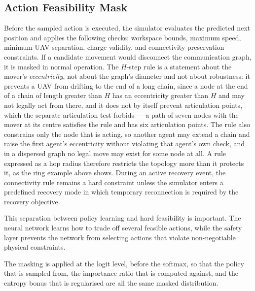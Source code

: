 \documentclass[conference]{IEEEtran}
\begin{document}
\subsection{Action Feasibility Mask}
Before the sampled action is executed, the simulator evaluates the predicted next position and applies the following checks: workspace bounds, maximum speed, minimum UAV separation, charge validity, and connectivity-preservation constraints. If a candidate movement would disconnect the communication graph, it is masked in normal operation.  The $H$-step rule is a statement about the mover's \emph{eccentricity}, not about the graph's diameter and not about robustness: it prevents a UAV from drifting to the end of a long chain, since a node at the end of a chain of length greater than $H$ has an eccentricity greater than $H$ and may not legally act from there, and it does not by itself prevent articulation points, which the separate articulation test forbids --- a path of seven nodes with the mover at its centre satisfies the rule and has six articulation points. The rule also constrains only the node that is acting, so another agent may extend a chain and raise the first agent's eccentricity without violating that agent's own check, and in a dispersed graph no legal move may exist for some node at all.  A rule expressed as a hop radius therefore restricts the topology more than it protects it, as the ring example above shows. During an active recovery event, the connectivity rule remains a hard constraint unless the simulator enters a predefined recovery mode in which temporary reconnection is required by the recovery objective.

This separation between policy learning and hard feasibility is important. The neural network learns how to trade off several feasible actions, while the safety layer prevents the network from selecting actions that violate non-negotiable physical constraints.

The masking is applied at the logit level, before the softmax, so that the policy that is sampled from, the importance ratio that is computed against, and the entropy bonus that is regularised are all the same masked distribution.
\end{document}
